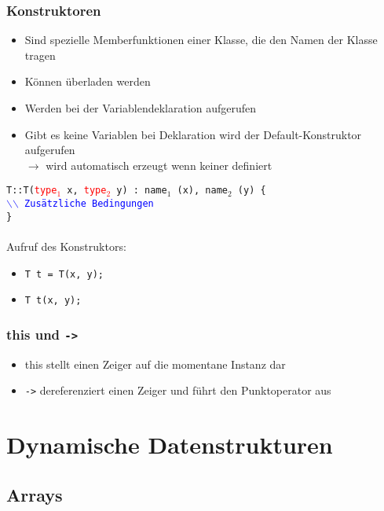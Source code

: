 \documentclass[a3paper, 10pt, landscape]{scrartcl}
\newcommand{\code}[1]{\texttt{#1}}
\begin{document}
\begin{multicols*}{3}
	\subsubsection{Konstruktoren}
	\vspace{0.1cm}
	\begin{itemize}
		\item Sind spezielle Memberfunktionen einer Klasse, die den Namen der Klasse tragen
		\item Können überladen werden
		\item Werden bei der Variablendeklaration aufgerufen
		\item Gibt es keine Variablen bei Deklaration wird der Default-Konstruktor aufgerufen\\ $\rightarrow$ wird automatisch erzeugt wenn keiner definiert \\
	\end{itemize}
	\code{T::T(\textcolor{red}{type$_1$} x, \textcolor{red}{type$_2$} y) : name$_1$ (x), name$_2$ (y) \{ \\
	\phantom{T::T}\textcolor{blue}{$\backslash$$\backslash$ Zusätzliche Bedingungen} \\
	\}
	}\\\\
        Aufruf des Konstruktors:
	\begin{itemize}
	\item \code{T t = T(x, y);}
        \item \code{T t(x, y);}
        \end{itemize}
	\subsubsection{this und \code{->}}
	\begin{itemize}
		\item this stellt einen Zeiger auf die momentane Instanz dar
		\item \code{->} dereferenziert einen Zeiger und führt den Punktoperator aus
	\end{itemize}
	



\section{Dynamische Datenstrukturen}

	\subsection{Arrays}

\end{multicols*}
\end{document}
